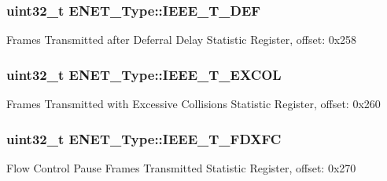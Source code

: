\subsubsection[{\texorpdfstring{I\+E\+E\+E\+\_\+\+T\+\_\+\+D\+EF}{IEEE_T_DEF}}]{ uint32\+\_\+t E\+N\+E\+T\+\_\+\+Type\+::\+I\+E\+E\+E\+\_\+\+T\+\_\+\+D\+EF}\hypertarget{structENET__Type_a00d5e8c4aad38410597664b71e208124}{}\label{structENET__Type_a00d5e8c4aad38410597664b71e208124}
Frames Transmitted after Deferral Delay Statistic Register, offset\+: 0x258 
\subsubsection[{\texorpdfstring{I\+E\+E\+E\+\_\+\+T\+\_\+\+E\+X\+C\+OL}{IEEE_T_EXCOL}}]{ uint32\+\_\+t E\+N\+E\+T\+\_\+\+Type\+::\+I\+E\+E\+E\+\_\+\+T\+\_\+\+E\+X\+C\+OL}\hypertarget{structENET__Type_a3498eb631e0d715aadc2b1903ab53f69}{}\label{structENET__Type_a3498eb631e0d715aadc2b1903ab53f69}
Frames Transmitted with Excessive Collisions Statistic Register, offset\+: 0x260 
\subsubsection[{\texorpdfstring{I\+E\+E\+E\+\_\+\+T\+\_\+\+F\+D\+X\+FC}{IEEE_T_FDXFC}}]{ uint32\+\_\+t E\+N\+E\+T\+\_\+\+Type\+::\+I\+E\+E\+E\+\_\+\+T\+\_\+\+F\+D\+X\+FC}\hypertarget{structENET__Type_a8ed661eecdb53112ee10939cfb01ff71}{}\label{structENET__Type_a8ed661eecdb53112ee10939cfb01ff71}
Flow Control Pause Frames Transmitted Statistic Register, offset\+: 0x270 
